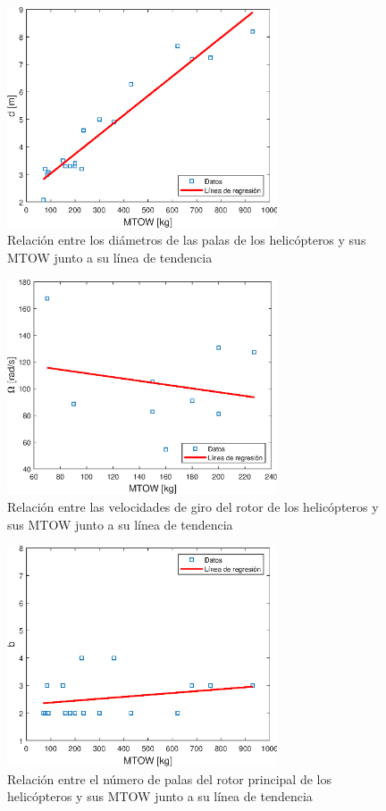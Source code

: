 \begin{figure}
	\centering
	\includegraphics[width=80mm]{graficos/anald}
	\caption{Relación entre los diámetros de las palas de los helicópteros y sus MTOW junto a su línea de tendencia}
	\label{diamAS}
\end{figure}
\begin{figure}
	\centering
	\includegraphics[width=80mm]{graficos/analomega}
	\caption{Relación entre las velocidades de giro del rotor de los helicópteros y sus MTOW junto a su línea de tendencia}
	\label{omegaAS}
\end{figure}
\begin{figure}
	\centering
	\includegraphics[width=80mm]{graficos/analb}
	\caption{Relación entre el número de palas del rotor principal de los helicópteros y sus MTOW junto a su línea de tendencia}
	\label{bAS}
\end{figure}

